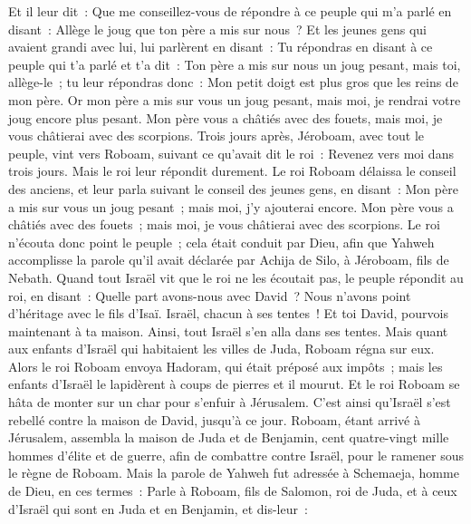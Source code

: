 \begin{multicols}{2}
Et il leur dit~: Que me conseillez-vous de répondre à ce peuple qui m'a parlé en disant~: Allège le joug que ton père a mis sur nous~?
Et les jeunes gens qui avaient grandi avec lui, lui parlèrent en disant~: Tu répondras en disant à ce peuple qui t'a parlé et t'a dit~: Ton père a mis sur nous un joug pesant, mais toi, allège-le~; tu leur répondras donc~: Mon petit doigt est plus gros que les reins de mon père.
Or mon père a mis sur vous un joug pesant, mais moi, je rendrai votre joug encore plus pesant. Mon père vous a châtiés avec des fouets, mais moi, je vous châtierai avec des scorpions.
Trois jours après, Jéroboam, avec tout le peuple, vint vers Roboam, suivant ce qu'avait dit le roi~: Revenez vers moi dans trois jours.
Mais le roi leur répondit durement. Le roi Roboam délaissa le conseil des anciens,
et leur parla suivant le conseil des jeunes gens, en disant~: Mon père a mis sur vous un joug pesant~; mais moi, j'y ajouterai encore. Mon père vous a châtiés avec des fouets~; mais moi, je vous châtierai avec des scorpions.
Le roi n'écouta donc point le peuple~; cela était conduit par Dieu, afin que Yahweh accomplisse la parole qu'il avait déclarée par Achija de Silo, à Jéroboam, fils de Nebath.
Quand tout Israël vit que le roi ne les écoutait pas, le peuple répondit au roi, en disant~: Quelle part avons-nous avec David~? Nous n'avons point d'héritage avec le fils d'Isaï. Israël, chacun à ses tentes~! Et toi David, pourvois maintenant à ta maison. Ainsi, tout Israël s'en alla dans ses tentes.
Mais quant aux enfants d'Israël qui habitaient les villes de Juda, Roboam régna sur eux.
Alors le roi Roboam envoya Hadoram, qui était préposé aux impôts~; mais les enfants d'Israël le lapidèrent à coups de pierres et il mourut. Et le roi Roboam se hâta de monter sur un char pour s'enfuir à Jérusalem.
C'est ainsi qu'Israël s'est rebellé contre la maison de David, jusqu'à ce jour.
\VerseOne{}Roboam, étant arrivé à Jérusalem, assembla la maison de Juda et de Benjamin, cent quatre-vingt mille hommes d'élite et de guerre, afin de combattre contre Israël, pour le ramener sous le règne de Roboam.
Mais la parole de Yahweh fut adressée à Schemaeja, homme de Dieu, en ces termes~:
Parle à Roboam, fils de Salomon, roi de Juda, et à ceux d'Israël qui sont en Juda et en Benjamin, et dis-leur~:

\end{multicols}
